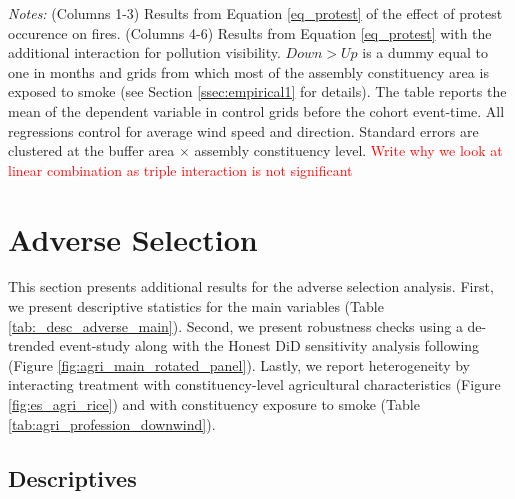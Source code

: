 \documentclass[12pt]{article}
\providecommand{\resultsuffix}{}
\let\SourceInput
\renewcommand{}[1]{%
  \IfFileExists{../../#1\resultsuffix.tex}{\SourceInput{../../#1\resultsuffix.tex}}{%
  \IfFileExists{../../#1}{\SourceInput{../../#1}}{%
    \IfFileExists{../../#1.tex}{\SourceInput{../../#1.tex}}{%
      \fbox{\scriptsize Missing table: \detokenize{#1}}}}}}
\begin{document}
\begin{table}[htbp!]
    \centering
    \caption{Effect of Protest occurrence on number of fires, by constituency exposure to smoke}
    \label{tab:protest_downup}
    \resizebox{\textwidth}{!}{
    
    }
    \begin{minipage}{\textwidth}
        {\small \textit{Notes: } (Columns 1-3) Results from Equation \ref{eq_protest} of the effect of protest occurence on fires. (Columns 4-6) Results from Equation \ref{eq_protest} with the additional interaction for pollution visibility. $Down>Up$ is a dummy equal to one in months and grids from which most of the assembly constituency area is exposed to
smoke (see Section \ref{ssec:empirical1} for details). 
        The table reports the mean of the dependent variable in control grids before the cohort event-time.  All regressions control for average wind speed and direction. 
        Standard errors are clustered at the buffer area $\times$ assembly constituency level. \textcolor{red}{Write why we look at linear combination as triple interaction is not significant}
        }
    \end{minipage}
\end{table}






\newpage
\FloatBarrier

\section{Adverse Selection}

This section presents additional results for the adverse selection analysis. First, we present descriptive statistics for the main variables (Table \ref{tab:_desc_adverse_main}). Second, we present robustness checks using a de-trended event-study along with the Honest DiD sensitivity analysis following \citet{rambachan2023more} (Figure \ref{fig:agri_main_rotated_panel}). Lastly, we report heterogeneity by interacting treatment with constituency-level agricultural characteristics (Figure \ref{fig:es_agri_rice}) and with constituency exposure to smoke (Table \ref{tab:agri_profession_downwind}).

\subsection{Descriptives}
\end{document}
